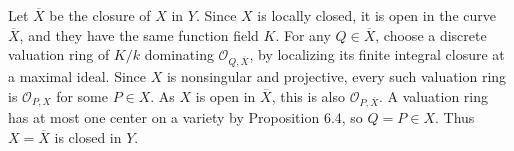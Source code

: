 Let $\overline X$ be the closure of $X$ in $Y$. Since $X$ is locally closed, it is open in the curve $\overline X$, and they have the same function field $K$. For any $Q\in\overline X$, choose a discrete valuation ring of $K/k$ dominating $\mathcal O_{Q,\overline X}$, by localizing its finite integral closure at a maximal ideal. Since $X$ is nonsingular and projective, every such valuation ring is $\mathcal O_{P,X}$ for some $P\in X$. As $X$ is open in $\overline X$, this is also $\mathcal O_{P,\overline X}$. A valuation ring has at most one center on a variety by Proposition 6.4, so $Q=P\in X$. Thus $X=\overline X$ is closed in $Y$.

